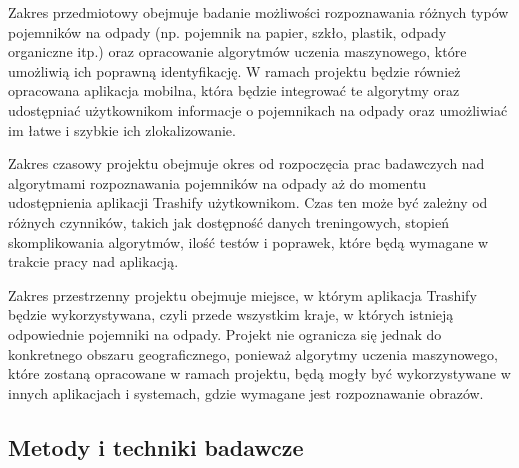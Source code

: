 \documentclass[12pt,oneside]{book}
\begin{document}
Zakres przedmiotowy obejmuje badanie możliwości rozpoznawania różnych typów pojemników na odpady (np. pojemnik na papier, szkło, plastik, odpady organiczne itp.) oraz opracowanie algorytmów uczenia maszynowego, które umożliwią ich poprawną identyfikację. W ramach projektu będzie również opracowana aplikacja mobilna, która będzie integrować te algorytmy oraz udostępniać użytkownikom informacje o pojemnikach na odpady oraz umożliwiać im łatwe i szybkie ich zlokalizowanie.

Zakres czasowy projektu obejmuje okres od rozpoczęcia prac badawczych nad algorytmami rozpoznawania pojemników na odpady aż do momentu udostępnienia aplikacji Trashify użytkownikom. Czas ten może być zależny od różnych czynników, takich jak dostępność danych treningowych, stopień skomplikowania algorytmów, ilość testów i poprawek, które będą wymagane w trakcie pracy nad aplikacją.

Zakres przestrzenny projektu obejmuje miejsce, w którym aplikacja Trashify będzie wykorzystywana, czyli przede wszystkim kraje, w których istnieją odpowiednie pojemniki na odpady. Projekt nie ogranicza się jednak do konkretnego obszaru geograficznego, ponieważ algorytmy uczenia maszynowego, które zostaną opracowane w ramach projektu, będą mogły być wykorzystywane w innych aplikacjach i systemach, gdzie wymagane jest rozpoznawanie obrazów.

\subsection{Metody i techniki badawcze}
\end{document}
